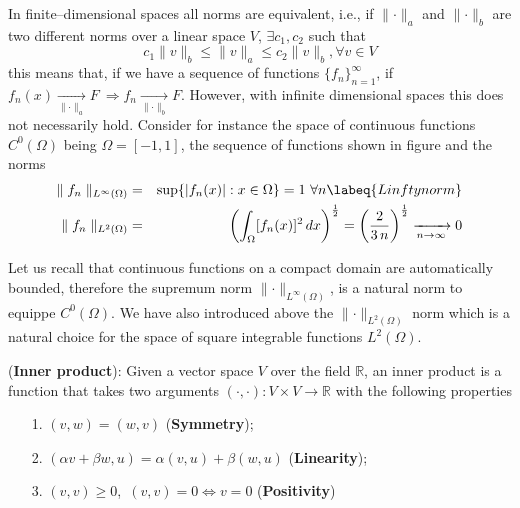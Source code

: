 In finite--dimensional spaces all norms are equivalent, i.e.,
if $\parallel \cdot \parallel_a$ and $\parallel \cdot \parallel_b$
are two different norms over a linear space $V$, $\exists c_1,c_2$
such that
\begin{equation}
       c_1 \lVert v \rVert_b \le \lVert v \rVert_a \le c_2 \lVert v \rVert_b,\forall v \in V
\end{equation}
this means that, if we have a sequence of functions $\{f_n\}_{n=1}^{\infty}$,
if $f_n(x) \xrightarrow[\parallel \cdot \parallel_a]{} F~\Rightarrow f_n \xrightarrow[\parallel \cdot \parallel_b]{} F$.
However, with infinite dimensional spaces this does not necessarily hold.
Consider for instance the space of continuous functions
$C^0(\Omega)$ being $\Omega = [-1,1]$, the sequence of functions 
shown in figure  and the norms
\begin{eqnarray}
\parallel f_n \parallel_{L^{\infty}(\Omega)} & = & \sup \{ |f_n(x)|: x \in \Omega \} = 1~\forall n \labeq{Linftynorm}\\
\parallel f_n \parallel_{L^2(\Omega)} & = & \left ( \int_{\Omega}[f_n(x)]^2\,dx \right )^{\frac12} =
\left (\frac{2}{3\,n} \right)^{\frac12} \xrightarrow[n\rightarrow \infty]{} 0
\end{eqnarray}

Let us recall that continuous functions on a compact
domain are automatically
bounded, therefore the supremum norm $\parallel \cdot \parallel_{L^{\infty}(\Omega)}$,
is a natural norm to equippe $C^0(\Omega)$.
We have also introduced above the $\parallel \cdot \parallel_{L^{2}(\Omega)}$ norm which is a natural
choice for the space of square integrable functions $L^{2}(\Omega)$.


\begin{definition} 
(\textbf{Inner product}):
Given a vector space $V$ over the field $\mathbb{R}$,
an inner product is a function that takes two arguments
$(\cdot,\cdot):  V \times V \rightarrow \mathbb{R}$
with the following properties
\begin{itemize}
\item[1.] $(v,w) = (w,v)$ (\textbf{Symmetry});\\
\item[2.] $(\alpha v + \beta w, u) = \alpha (v,u) + \beta (w,u)$ (\textbf{Linearity});\\
\item[3.] $(v,v) \ge 0$,~$(v,v) = 0 \Leftrightarrow v = 0$ (\textbf{Positivity})
\end{itemize}
\end{definition}

